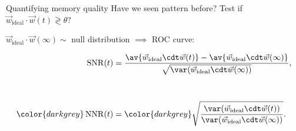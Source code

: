 \documentclass{beamer}%
\newcommand{\inv}{^{-1}}
\newcommand{\syn}{\vec{w}}
\newcommand{\synid}{\syn_\text{ideal}}
\DeclareMathOperator{\snr}{SNR}
\renewcommand{\e}{\mathsf{e}}
\begin{document}
\begin{frame}{Quantifying memory quality}
%
 Have we seen pattern before?
 Test if $\synid \cdot \syn(t) \gtrless \theta$?

 $\synid \cdot \syn(\infty) \sim$  null distribution
 $\implies$ ROC curve:

 \vp
 \parbox[t]{0.4\linewidth}{%
 }
 \parbox[t]{0.55\linewidth}{%
 \vspace{-\baselineskip}
 \begin{equation*}
   \begin{aligned}
     \snr(t) &= \frac{ \av{\synid\cdt\syn(t)} - \av{\synid\cdt\syn(\infty)} }{ \sqrt{\var(\synid\cdt\syn(\infty))}}, \\[1cm]
    \color{darkgrey} \operatorname{NNR}(t) &= \color{darkgrey} \sqrt{\frac{ \var(\synid\cdt\syn(t)) }{ \var(\synid\cdt\syn(\infty)) }}.
   \end{aligned}
 \end{equation*}
 }

%
\end{frame}

\end{document}
